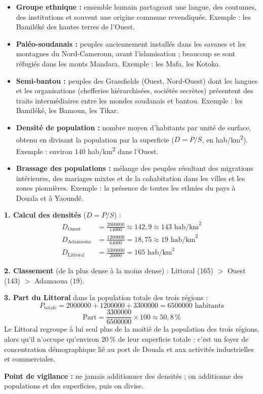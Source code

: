 \documentclass[11pt]{article}
\begin{document}
\begin{corrige}
\begin{itemize}
\item \textbf{Groupe ethnique :} ensemble humain partageant une langue, des coutumes, des institutions et souvent une origine commune revendiquée. Exemple : les Bamiléké des hautes terres de l'Ouest.
\item \textbf{Paléo-soudanais :} peuples anciennement installés dans les savanes et les montagnes du Nord-Cameroun, avant l'islamisation ; beaucoup se sont réfugiés dans les monts Mandara. Exemple : les Mafa, les Kotoko.
\item \textbf{Semi-bantou :} peuples des Grassfields (Ouest, Nord-Ouest) dont les langues et les organisations (chefferies hiérarchisées, sociétés secrètes) présentent des traits intermédiaires entre les mondes soudanais et bantou. Exemple : les Bamiléké, les Bamoun, les Tikar.
\item \textbf{Densité de population :} nombre moyen d'habitants par unité de surface, obtenu en divisant la population par la superficie ($D = P/S$, en hab/km\textsuperscript{2}). Exemple : environ 140 hab/km\textsuperscript{2} dans l'Ouest.
\item \textbf{Brassage des populations :} mélange des peuples résultant des migrations intérieures, des mariages mixtes et de la cohabitation dans les villes et les zones pionnières. Exemple : la présence de toutes les ethnies du pays à Douala et à Yaoundé.
\end{itemize}
\end{corrige}

\begin{corrige}
\textbf{1. Calcul des densités} ($D = P/S$) :
\begin{align*}
D_{\text{Ouest}} &= \frac{\num{2000000}}{\num{14000}} \approx 142,9 \approx 143 \text{ hab/km}^2 \\
D_{\text{Adamaoua}} &= \frac{\num{1200000}}{\num{64000}} = 18,75 \approx 19 \text{ hab/km}^2 \\
D_{\text{Littoral}} &= \frac{\num{3300000}}{\num{20000}} = 165 \text{ hab/km}^2
\end{align*}

\textbf{2. Classement} (de la plus dense à la moins dense) : Littoral (165) $>$ Ouest (143) $>$ Adamaoua (19).

\textbf{3. Part du Littoral} dans la population totale des trois régions :
\[ P_{\text{totale}} = \num{2000000} + \num{1200000} + \num{3300000} = \num{6500000} \text{ habitants} \]
\[ \text{Part} = \frac{\num{3300000}}{\num{6500000}} \times 100 \approx 50,8\,\% \]
Le Littoral regroupe à lui seul plus de la moitié de la population des trois régions, alors qu'il n'occupe qu'environ 20\,\% de leur superficie totale : c'est un foyer de concentration démographique lié au port de Douala et aux activités industrielles et commerciales.

\textbf{Point de vigilance :} ne jamais additionner des densités ; on additionne des populations et des superficies, puis on divise.
\end{corrige}
\end{document}
